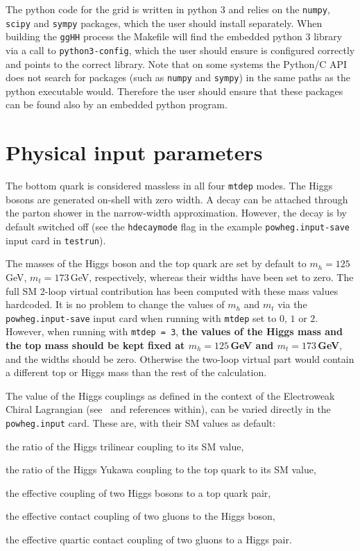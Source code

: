 \documentclass[paper]{JHEP3}
\renewenvironment{description}[1][0pt]
  {\list{}{\labelwidth=0pt \leftmargin=#1
   \let\makelabel\descriptionlabel}}
  {\endlist}
\begin{document}
The python code for the grid is written in python 3 and relies on the {\tt numpy}, {\tt scipy} and {\tt sympy} packages, which 
the user should install separately. When building the {\tt ggHH} process the Makefile will find the embedded python 3 library
via a call to {\tt python3-config}, which the user should ensure is configured correctly and points to the correct library.
Note that on some systems the Python/C API does not search for packages (such as {\tt numpy} and {\tt sympy}) in the same 
paths as the python executable would. Therefore the user should ensure that these packages can be found also by an embedded python program.

\section{Physical input parameters}

The bottom quark is considered massless in all four {\tt mtdep} modes. The Higgs
bosons are generated on-shell with zero width. A decay can be attached
through the parton shower in the narrow-width approximation. However,
the decay is by default switched off (see the {\tt hdecaymode} flag in the
example {\tt powheg.input-save} input card in {\tt testrun}).

The masses of the Higgs boson and the top quark are set by default to
$m_h=125$\,GeV, $m_t=173$\,GeV, respectively, whereas their widths
have been set to zero. The full SM 2-loop virtual contribution has
been computed with these mass values hardcoded. 
It is no problem to change the values of $m_h$
and $m_t$ via the {\tt powheg.input-save} input card when running with
{\tt mtdep} set to $0$, $1$ or $2$.
However, when running with {\tt mtdep = 3}, 
 {\bf the values of the Higgs mass and
the top mass should be kept fixed at $m_h=125$\,GeV and $m_t=173$\,GeV}, and the widths should be zero.
Otherwise the two-loop virtual part would contain a different top or Higgs mass than the rest of the calculation.

The value of the Higgs couplings as defined in the context of the Electroweak Chiral Lagrangian (see~\cite{Buchalla:2018yce} and references within), can be varied directly in the {\tt powheg.input} card. These are, with their SM values as default:

\begin{description}[.3in]
\item[{\tt chhh=1.0}:] { the ratio of the Higgs trilinear coupling to its SM value,}
\item[{\tt ct=1.0}:] { the ratio of the Higgs Yukawa coupling to the top quark to its SM value,}
\item[{\tt ctt=0.0}:] { the effective coupling of two Higgs bosons to a top quark pair,}
\item[{\tt cggh=0.0}:] { the effective contact coupling of two gluons to the Higgs boson,}
\item[{\tt cgghh=0.0}:] { the effective quartic contact coupling of two gluons to a Higgs pair.}
\end{description}
\end{document}

